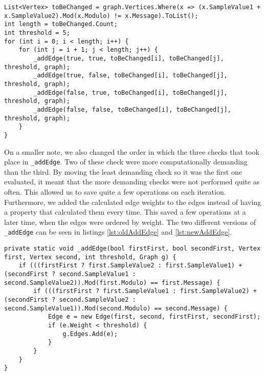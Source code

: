 \begin{lstlisting}[firstnumber=449,label=lst:newEdgeAdding, caption={Improved algorithm for adding edges to the graph. From second round JPEGImage.cs.}]
List<Vertex> toBeChanged = graph.Vertices.Where(x => (x.SampleValue1 + x.SampleValue2).Mod(x.Modulo) != x.Message).ToList();
int length = toBeChanged.Count;
int threshold = 5;
for (int i = 0; i < length; i++) {
    for (int j = i + 1; j < length; j++) {
        _addEdge(true, true, toBeChanged[i], toBeChanged[j], threshold, graph);
        _addEdge(true, false, toBeChanged[i], toBeChanged[j], threshold, graph);
        _addEdge(false, true, toBeChanged[i], toBeChanged[j], threshold, graph);
        _addEdge(false, false, toBeChanged[i], toBeChanged[j], threshold, graph);
    }
}
\end{lstlisting}

On a smaller note, we also changed the order in which the three checks that took place in \lstinline|_addEdge|.
Two of these check were more computationally demanding than the third.
By moving the least demanding check so it was the first one evaluated, it meant that the more demanding checks were not performed quite as often.
This allowed us to save quite a few operations on each iteration.
Furthermore, we added the calculated edge weights to the edges instead of having a property that calculated them every time.
This saved a few operations at a later time, when the edges were ordered by weight.
The two different versions of \lstinline|_addEdge| can be seen in listings \ref{lst:oldAddEdge} and \ref{lst:newAddEdge}.

\begin{lstlisting}[firstnumber=478,label=lst:oldAddEdge, caption={The original \lstinline|_addEdge| method. From first round JPEGImage.cs.}]
private static void _addEdge(bool firstFirst, bool secondFirst, Vertex first, Vertex second, int threshold, Graph g) {
    if (((firstFirst ? first.SampleValue2 : first.SampleValue1) + (secondFirst ? second.SampleValue1 : second.SampleValue2)).Mod(first.Modulo) == first.Message) {
        if (((firstFirst ? first.SampleValue1 : first.SampleValue2) + (secondFirst ? second.SampleValue2 : second.SampleValue1)).Mod(second.Modulo) == second.Message) {
            Edge e = new Edge(first, second, firstFirst, secondFirst);
            if (e.Weight < threshold) {
                g.Edges.Add(e);
            }
        }
    }
}
\end{lstlisting}


